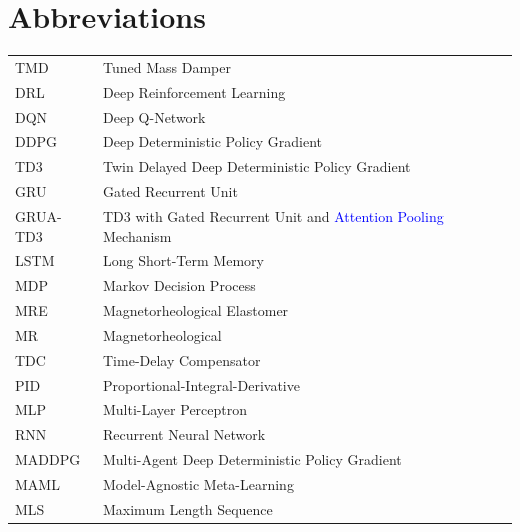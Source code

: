\documentclass[review]{elsarticle}
\begin{document}
\linenumbers

\section*{Abbreviations}
\begin{longtable}{@{}p{3.0cm} p{12.0cm}@{}}
TMD & Tuned Mass Damper \\[1em]
DRL & Deep Reinforcement Learning \\[1em]
DQN & Deep Q-Network \\[1em]
DDPG & Deep Deterministic Policy Gradient \\[1em]
TD3 & Twin Delayed Deep Deterministic Policy Gradient \\[1em]
GRU & Gated Recurrent Unit \\[1em]
GRUA-TD3 & TD3 with Gated Recurrent Unit and \textcolor{blue}{Attention Pooling} Mechanism \\[1em]
LSTM & Long Short-Term Memory \\[1em]
MDP & Markov Decision Process \\[1em]
MRE & Magnetorheological Elastomer \\[1em]
MR & Magnetorheological \\[1em]
TDC & Time-Delay Compensator \\[1em]
PID & Proportional-Integral-Derivative \\[1em]
MLP & Multi-Layer Perceptron \\[1em]
RNN & Recurrent Neural Network \\[1em]
MADDPG & Multi-Agent Deep Deterministic Policy Gradient \\[1em]
MAML & Model-Agnostic Meta-Learning \\[1em]
MLS & Maximum Length Sequence
\end{longtable}
\end{document}
